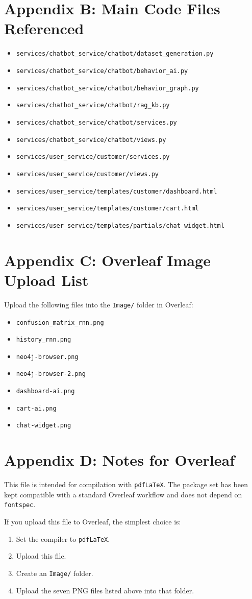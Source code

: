 \documentclass[12pt,a4paper]{article}
\begin{document}
\section{Appendix B: Main Code Files Referenced}

\begin{itemize}
  \item \texttt{services/chatbot\_service/chatbot/dataset\_generation.py}
  \item \texttt{services/chatbot\_service/chatbot/behavior\_ai.py}
  \item \texttt{services/chatbot\_service/chatbot/behavior\_graph.py}
  \item \texttt{services/chatbot\_service/chatbot/rag\_kb.py}
  \item \texttt{services/chatbot\_service/chatbot/services.py}
  \item \texttt{services/chatbot\_service/chatbot/views.py}
  \item \texttt{services/user\_service/customer/services.py}
  \item \texttt{services/user\_service/customer/views.py}
  \item \texttt{services/user\_service/templates/customer/dashboard.html}
  \item \texttt{services/user\_service/templates/customer/cart.html}
  \item \texttt{services/user\_service/templates/partials/chat\_widget.html}
\end{itemize}

\section{Appendix C: Overleaf Image Upload List}
Upload the following files into the \texttt{Image/} folder in Overleaf:
\begin{itemize}
  \item \texttt{confusion\_matrix\_rnn.png}
  \item \texttt{history\_rnn.png}
  \item \texttt{neo4j-browser.png}
  \item \texttt{neo4j-browser-2.png}
  \item \texttt{dashboard-ai.png}
  \item \texttt{cart-ai.png}
  \item \texttt{chat-widget.png}
\end{itemize}

\section{Appendix D: Notes for Overleaf}
This file is intended for compilation with \texttt{pdfLaTeX}. The package set has been kept compatible with a standard Overleaf workflow and does not depend on \texttt{fontspec}.

If you upload this file to Overleaf, the simplest choice is:
\begin{enumerate}[label=\arabic*.]
  \item Set the compiler to \texttt{pdfLaTeX}.
  \item Upload this file.
  \item Create an \texttt{Image/} folder.
  \item Upload the seven PNG files listed above into that folder.
\end{enumerate}
\end{document}
